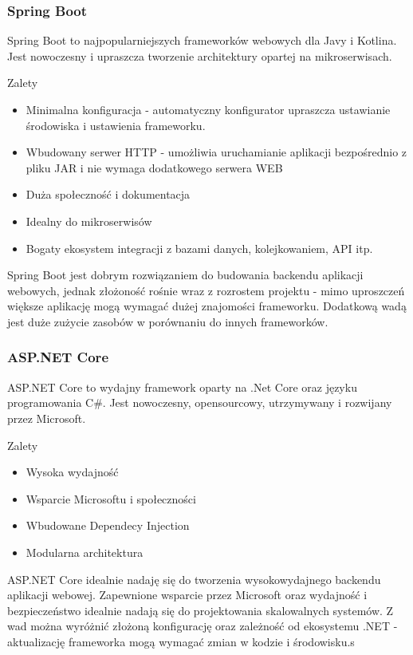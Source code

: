 \subsubsection{Spring Boot}

Spring Boot to najpopularniejszych frameworków webowych dla Javy i Kotlina. Jest nowoczesny i upraszcza tworzenie architektury opartej na mikroserwisach.


Zalety
\begin{itemize}
	\item Minimalna konfiguracja - automatyczny konfigurator upraszcza ustawianie środowiska i ustawienia frameworku.
	\item Wbudowany serwer HTTP - umożliwia uruchamianie aplikacji bezpośrednio z pliku JAR i nie wymaga dodatkowego serwera WEB
	\item Duża społeczność i dokumentacja
	\item Idealny do mikroserwisów
	\item Bogaty ekosystem integracji z bazami danych, kolejkowaniem, API itp.
\end{itemize}

Spring Boot jest dobrym rozwiązaniem do budowania backendu aplikacji webowych, jednak złożoność rośnie wraz z rozrostem projektu - mimo uproszczeń większe aplikację mogą wymagać dużej znajomości frameworku. Dodatkową wadą jest duże zużycie zasobów w porównaniu do innych frameworków.

\subsubsection{ASP.NET Core}

ASP.NET Core to wydajny framework oparty na .Net Core oraz języku programowania C\#. Jest nowoczesny, opensourcowy, utrzymywany i rozwijany przez Microsoft.

Zalety
\begin{itemize}
	\item Wysoka wydajność
	\item Wsparcie Microsoftu i społeczności
	\item Wbudowane Dependecy Injection
	\item Modularna architektura
\end{itemize}


ASP.NET Core idealnie nadaję się do tworzenia wysokowydajnego backendu aplikacji webowej. Zapewnione wsparcie przez Microsoft oraz wydajność i bezpieczeństwo idealnie nadają się do projektowania skalowalnych systemów. Z wad można wyróżnić złożoną konfigurację oraz zależność od ekosystemu .NET - aktualizację frameworka mogą wymagać zmian w kodzie i środowisku.s

